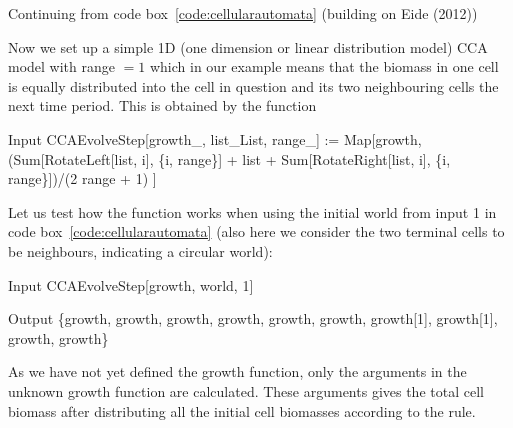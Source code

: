 \documentclass[11pt,fleqn]{book} %
\begin{document}
\begin{theorem}
\hfill \break
Continuing from code box~\ref{code:cellularautomata} (building on Eide (2012)\cite{Eide2012})

Now we set up a simple 1D (one dimension or linear distribution model) CCA model with range $= 1$ which in our example means that the biomass in one cell is equally distributed into the cell in question and its two neighbouring cells the next time period. This is obtained by the function
\begin{mmaCell}[index=9]{Input}
  CCAEvolveStep[growth_, list_List, range_] := 
    Map[growth, 
      (Sum[RotateLeft[list, i], \{i, range\}] + list + 
      Sum[RotateRight[list, i], \{i, range\}])/(2 range + 1)
    ]
\end{mmaCell}
Let us test how the function works when using the initial world from input 1 in code box~\ref{code:cellularautomata} (also here we consider the two terminal cells to be neighbours, indicating a circular world):
\begin{mmaCell}{Input}
  CCAEvolveStep[growth, world, 1]
\end{mmaCell}
\begin{mmaCell}{Output}
  \{growth, growth, growth, growth, growth, 
  growth, growth[1], growth[1], growth, growth\}
\end{mmaCell}
As we have not yet defined the growth function, only the arguments in the unknown growth function are calculated. These arguments gives the total cell biomass after distributing all the initial cell biomasses according to the rule.


\end{theorem}
\end{document}
